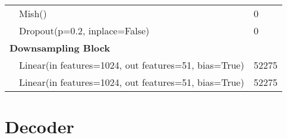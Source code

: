 \begin{center}
\begin{tabular}{ p{} p{}  p{}}
                                                        & Mish()                                                  & 0                   \\
                                                        & Dropout(p=0.2, inplace=False)                           & 0                   \\
        \multicolumn{2}{l}{\textbf{Downsampling Block}} &                                                                               \\
                                                        & Linear(in features=1024, out features=51, bias=True)    & 52275               \\
                                                        & Linear(in features=1024, out features=51, bias=True)    & 52275               \\
    \end{tabular}
\end{center}

\newpage


\section{Decoder}

